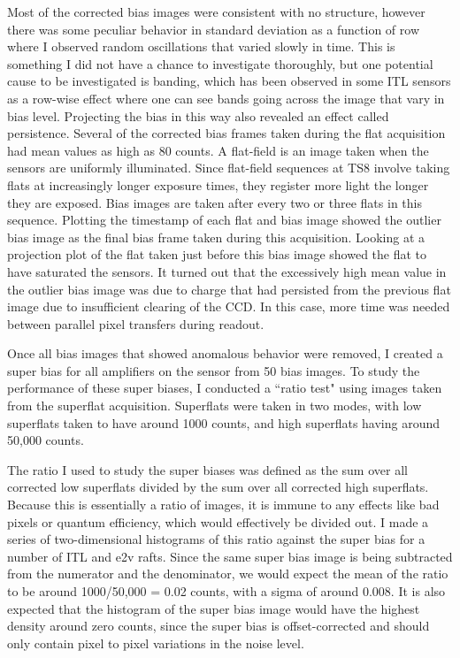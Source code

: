 Most of the corrected bias images were consistent with no structure, however there was some peculiar behavior in standard deviation as a function of row where I observed random oscillations that varied slowly in time. This is something I did not have a chance to investigate thoroughly, but one potential cause to be investigated is banding, which has been observed in some ITL sensors as a row-wise effect where one can see bands going across the image that vary in bias level. Projecting the bias in this way also revealed an effect called persistence. Several of the corrected bias frames taken during the flat acquisition had mean values as high as 80 counts. A flat-field is an image taken when the sensors are uniformly illuminated. Since flat-field sequences at TS8 involve taking flats at increasingly longer exposure times, they register more light the longer they are exposed. Bias images are taken after every two or three flats in this sequence. Plotting the timestamp of each flat and bias image showed the outlier bias image as the final bias frame taken during this acquisition. Looking at a projection plot of the flat taken just before this bias image showed the flat to have saturated the sensors. It turned out that the excessively high mean value in the outlier bias image was due to charge that had persisted from the previous flat image due to insufficient clearing of the CCD. In this case, more time was needed between parallel pixel transfers during readout. 


Once all bias images that showed anomalous behavior were removed, I created a super bias for all amplifiers on the sensor from 50 bias images. To study the performance of these super biases, I conducted a ``ratio test" using images taken from the superflat acquisition. Superflats were taken in two modes, with low superflats taken to have around 1000 counts, and high superflats having around 50,000 counts. 

The ratio I used to study the super biases was defined as the sum over all corrected low superflats divided by the sum over all corrected high superflats. Because this is essentially a ratio of images, it is immune to any effects like bad pixels or quantum efficiency, which would effectively be divided out. I made a series of two-dimensional histograms of this ratio against the super bias for a number of ITL and e2v rafts. Since the same super bias image is being subtracted from the numerator and the denominator, we would expect the mean of the ratio to be around 1000/50,000 = 0.02 counts, with a sigma of around 0.008. It is also expected that the histogram of the super bias image would have the highest density around zero counts, since the super bias is offset-corrected and should only contain pixel to pixel variations in the noise level. 

